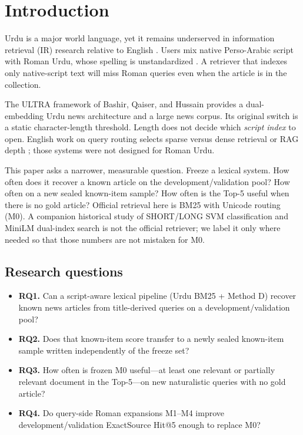 \documentclass[10pt,letterpaper]{article}
\begin{document}
\section*{Introduction}

Urdu is a major world language, yet it remains underserved in information retrieval (IR) research relative to English \cite{daud2017urdu,kazi2025urdu}. Users mix native Perso-Arabic script with Roman Urdu, whose spelling is unstandardized \cite{hussain2025qlora,mehmood2020xtreme,sitaram2019codeswitch}. A retriever that indexes only native-script text will miss Roman queries even when the article is in the collection.

The ULTRA framework of Bashir, Qaiser, and Hussain \cite{bashir2026ultra} provides a dual-embedding Urdu news architecture and a large news corpus. Its original switch is a static character-length threshold. Length does not decide which \emph{script index} to open. English work on query routing selects sparse versus dense retrieval \cite{arabzadeh2021predicting} or RAG depth \cite{jeong2024adaptiverag}; those systems were not designed for Roman Urdu.

This paper asks a narrower, measurable question. Freeze a lexical system. How often does it recover a known article on the development/validation pool? How often on a new sealed known-item sample? How often is the Top-5 useful when there is no gold article? Official retrieval here is BM25 with Unicode routing (M0). A companion historical study of SHORT/LONG SVM classification and MiniLM dual-index search is not the official retriever; we label it only where needed so that those numbers are not mistaken for M0.

\subsection*{Research questions}

\begin{itemize}
\item \textbf{RQ1.} Can a script-aware lexical pipeline (Urdu BM25 + Method D) recover known news articles from title-derived queries on a development/validation pool?
\item \textbf{RQ2.} Does that known-item score transfer to a newly sealed known-item sample written independently of the freeze set?
\item \textbf{RQ3.} How often is frozen M0 useful---at least one relevant or partially relevant document in the Top-5---on new naturalistic queries with no gold article?
\item \textbf{RQ4.} Do query-side Roman expansions M1--M4 improve development/validation ExactSource Hit@5 enough to replace M0?
\end{itemize}
\end{document}
